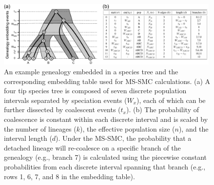 \documentclass[11pt]{article}
\begin{document}


\begin{figure}[t]
	\centering
	\includegraphics[width=0.99\textwidth]{figures/current/Fig2-embedding-table.pdf}
	\caption{
		An example genealogy embedded in a species tree and the corresponding
		embedding table used for MS-SMC calculations. 
		(a) A four tip species tree is composed of seven discrete population
		intervals separated by speciation events ($W_x$), each of which can be
		further dissected by coalescent events ($t_x$).
		(b) The probability of coalescence is constant within each discrete
		interval and is scaled by the number of lineages ($k$), the effective 
		population size ($n$), and the interval length ($d$).
		Under the MS-SMC, the probability that a detached lineage will re-coalesce
		on a specific branch of the genealogy (e.g., branch 7) is calculated using
		the piecewise constant probabilities from each discrete interval spanning
		that branch (e.g., rows 1, 6, 7, and 8 in the embedding table).
	}
\label{fig:embedding-table}
\end{figure}
\end{document}
